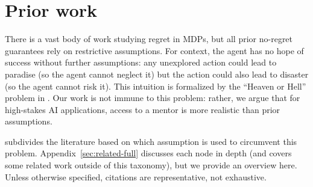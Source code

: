 \section{Prior work}\label{sec:related}


There is a vast body of work studying regret in MDPs, but all prior no-regret guarantees rely on restrictive assumptions. For context, the agent has no hope of success without further assumptions: any unexplored action could lead to paradise (so the agent cannot neglect it) but the action could also lead to disaster (so the agent cannot risk it). This intuition is formalized by the ``Heaven or Hell'' problem in . Our work is not immune to this problem: rather, we argue that for high-stakes AI applications, access to a mentor is more realistic than prior assumptions.

 subdivides the literature based on which assumption is used to circumvent this problem. Appendix~\ref{sec:related-full} discusses each node in depth (and covers some related work outside of this taxonomy), but we provide an overview here. Unless otherwise specified, citations are representative, not exhaustive.








